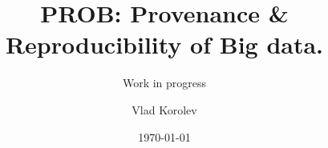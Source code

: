 \documentclass{beamer}
\title{PROB: Provenance \& Reproducibility of Big data.}
\subtitle{Work in progress}
\author{Vlad Korolev}
\date[]{ \today}
\begin{document}
{
\begin{frame}
  \titlepage
\end{frame}
}





\end{document}
